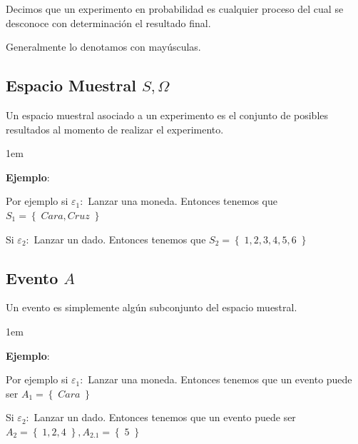 \documentclass[12pt, fleqn]{report}                             %
\newenvironment{SmallIndentation}[1][0.75em]                    %
        {\begin{adjustwidth}{#1}{}\begin{footnotesize}}             %
        {\end{footnotesize}\end{adjustwidth}}                       %
\theoremstyle{break}                                            %
\newcommand{\Set}[1]{\left\{ \; #1 \; \right\}}                 %
\begin{document}
                Decimos que un experimento en probabilidad es cualquier proceso del cual se desconoce
                con determinación el resultado final.

                Generalmente lo denotamos con mayúsculas.



            \vspace{1em}
            \subsection{Espacio Muestral $S, \Omega$}

                Un espacio muestral asociado a un experimento es el conjunto de posibles resultados al
                momento de realizar el experimento.

                 \begin{SmallIndentation}[1em]
                     \textbf{Ejemplo}:
                     
                    Por ejemplo si $\varepsilon_1:$ Lanzar una moneda.
                    Entonces tenemos que $S_1 = \Set{Cara, Cruz}$ 

                    Si $\varepsilon_2:$ Lanzar un dado.
                    Entonces tenemos que $S_2 = \Set{1, 2, 3, 4, 5, 6}$ 
                 
                 \end{SmallIndentation}


            \vspace{1em}
            \subsection{Evento $A$}

                Un evento es simplemente algún subconjunto del espacio muestral.

                 \begin{SmallIndentation}[1em]
                     \textbf{Ejemplo}:
                     
                    Por ejemplo si $\varepsilon_1:$ Lanzar una moneda.
                    Entonces tenemos que un evento puede ser $A_1 = \Set{Cara}$ 

                    Si $\varepsilon_2:$ Lanzar un dado.
                    Entonces tenemos que un evento puede ser $A_2 = \Set{1, 2, 4}, A_{2.1} = \Set{5}$ 
                 
                 \end{SmallIndentation}
\end{document}
